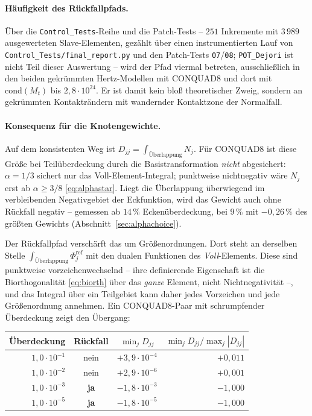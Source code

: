 \documentclass[a4paper,11pt]{article}
\def\bm#1{#1}%
\def\tfrac#1#2{#1/#2}%
\def\tilde#1{#1}%
\newcommand{\file}[1]{\texttt{\small #1}}
\begin{document}
\paragraph{Häufigkeit des Rückfallpfads.}
Über die \file{Control\_Tests}-Reihe und die Patch-Tests -- $251$ Inkremente mit $3\,989$
ausgewerteten Slave-Elementen, gezählt über einen instrumentierten Lauf von
\file{Control\_Tests/final\_report.py} und den Patch-Tests \file{07}/\file{08};
\file{POT\_Dejori} ist nicht Teil dieser Auswertung -- wird der Pfad
viermal betreten, ausschließlich in den beiden gekrümmten Hertz-Modellen mit CONQUAD8 und dort mit
$\mathrm{cond}(\bm M_t)$ bis $2{,}8\cdot10^{24}$. Er ist damit kein bloß theoretischer Zweig,
sondern an gekrümmten Kontakträndern mit wandernder Kontaktzone der Normalfall.

\paragraph{Konsequenz für die Knotengewichte.}
Auf dem konsistenten Weg ist $\tilde D_{jj}=\int_{\text{Überlappung}}\tilde N_j$. Für CONQUAD8 ist
diese Größe bei Teilüberdeckung durch die Basistransformation \emph{nicht} abgesichert:
$\alpha=\tfrac13$ sichert nur das Voll-Element-Integral; punktweise nichtnegativ wäre $\tilde N_j$
erst ab $\alpha\ge\tfrac38$ \eqref{eq:alphastar}. Liegt die Überlappung überwiegend im
verbleibenden Negativgebiet der Eckfunktion, wird das Gewicht auch ohne Rückfall negativ --
gemessen ab $14\,\%$ Eckenüberdeckung, bei $9\,\%$ mit $-0{,}26\,\%$ des größten Gewichts
(Abschnitt~\ref{sec:alphachoice}).

Der Rückfallpfad verschärft das um Größenordnungen. Dort steht an derselben Stelle
$\int_{\text{Überlappung}}\Phi_j^{\text{ref}}$ mit den dualen Funktionen des \emph{Voll}-Elements.
Diese sind punktweise vorzeichenwechselnd -- ihre definierende Eigenschaft ist die
Biorthogonalität \eqref{eq:biorth} über das \emph{ganze} Element, nicht Nichtnegativität --, und das
Integral über ein Teilgebiet kann daher jedes Vorzeichen und jede Größenordnung annehmen. Ein
CONQUAD8-Paar mit schrumpfender Überdeckung zeigt den Übergang:

\begin{center}
\small
\begin{tabular}{rccr}
\toprule
Überdeckung & Rückfall & $\min_j\tilde D_{jj}$ & $\min_j\tilde D_{jj}/\max_j|\tilde D_{jj}|$ \\
\midrule
$1{,}0\cdot10^{-1}$ & nein & $+3{,}9\cdot10^{-4}$ & $+0{,}011$ \\
$1{,}0\cdot10^{-2}$ & nein & $+2{,}9\cdot10^{-6}$ & $+0{,}001$ \\
$1{,}0\cdot10^{-3}$ & \textbf{ja} & $-1{,}8\cdot10^{-3}$ & $-1{,}000$ \\
$1{,}0\cdot10^{-5}$ & \textbf{ja} & $-1{,}8\cdot10^{-5}$ & $-1{,}000$ \\
\bottomrule
\end{tabular}
\end{center}
\end{document}
